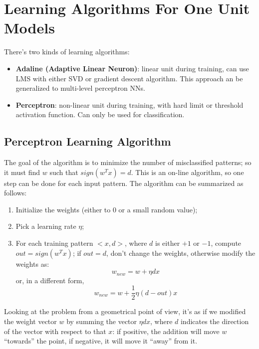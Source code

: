 \section{Learning Algorithms For One Unit Models}

There's two kinds of learning algorithms:
\begin{itemize}
    \item \textbf{Adaline (Adaptive Linear Neuron)}: linear unit during training, can use LMS with either SVD or gradient descent algorithm. This approach an be generalized to multi-level perceptron NNs.

    \item \textbf{Perceptron}: non-linear unit during training, with hard limit or threshold activation function. Can only be used for classification.
\end{itemize}

\subsection{Perceptron Learning Algorithm}

The goal of the algorithm is to minimize the number of misclassified patterns; so it must find $w$ such that $sign(w^Tx)=d$. This is an on-line algorithm, so one step can be done for each input pattern. The algorithm can be summarized as follows:

\begin{enumerate}
    \item Initialize the weights (either to 0 or a small random value);

    \item Pick a learning rate $\eta$;

    \item For each training pattern $<x,d>$, where $d$ is either $+1$ or $-1$, compute $out = sign(w^Tx)$; if $out = d$, don't change the weights, otherwise modify the weights as:
    \begin{equation*}
        w_{new} = w + \eta d x
    \end{equation*}
    or, in a different form,
    \begin{equation*}
        w_{new} = w + \frac{1}{2} \eta (d-out) x
    \end{equation*}
\end{enumerate}

Looking at the problem from a geometrical point of view, it's as if we modified the weight vector $w$ by summing the vector $\eta d x$, where $d$ indicates the direction of the vector with respect to that $x$: if positive, the addition will move $w$ ``towards'' the point, if negative, it will move it ``away'' from it.

